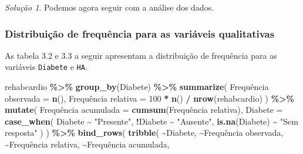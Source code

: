 \documentclass[
]{latex/krantz}
\newenvironment{Shaded}{\begin{snugshade}}{\end{snugshade}}
\newcommand{\AttributeTok}[1]{\textcolor[rgb]{0.13,0.29,0.53}{#1}}
\newcommand{\DecValTok}[1]{\textcolor[rgb]{0.00,0.00,0.81}{#1}}
\newcommand{\FunctionTok}[1]{\textcolor[rgb]{0.13,0.29,0.53}{\textbf{#1}}}
\newcommand{\NormalTok}[1]{#1}
\newcommand{\OtherTok}[1]{\textcolor[rgb]{0.56,0.35,0.01}{#1}}
\newcommand{\SpecialCharTok}[1]{\textcolor[rgb]{0.81,0.36,0.00}{\textbf{#1}}}
\newcommand{\StringTok}[1]{\textcolor[rgb]{0.31,0.60,0.02}{#1}}
\theoremstyle{definition}
\theoremstyle{definition}
\theoremstyle{definition}
\theoremstyle{definition}
\theoremstyle{remark}
\newtheorem*{solution}{Solução}
\begin{document}
\begin{solution}
Podemos agora seguir com a análise dos dados.

\hypertarget{distribuiuxe7uxe3o-de-frequuxeancia-para-as-variuxe1veis-qualitativas}{%
\subsubsection*{Distribuição de frequência para as variáveis qualitativas}\label{distribuiuxe7uxe3o-de-frequuxeancia-para-as-variuxe1veis-qualitativas}}

As tabela 3.2 e 3.3 a seguir apresentam a distribuição de frequência para as variáveis \texttt{Diabete} e \texttt{HA}.

\begin{Shaded}
\begin{Highlighting}[]
\NormalTok{rehabcardio }\SpecialCharTok{\%\textgreater{}\%}
  \FunctionTok{group\_by}\NormalTok{(Diabete) }\SpecialCharTok{\%\textgreater{}\%}
  \FunctionTok{summarize}\NormalTok{(}
    \StringTok{\textasciigrave{}}\AttributeTok{Frequência observada}\StringTok{\textasciigrave{}} \OtherTok{=} \FunctionTok{n}\NormalTok{(),}
    \StringTok{\textasciigrave{}}\AttributeTok{Frequência relativa}\StringTok{\textasciigrave{}} \OtherTok{=} \DecValTok{100} \SpecialCharTok{*} \FunctionTok{n}\NormalTok{() }\SpecialCharTok{/} \FunctionTok{nrow}\NormalTok{(rehabcardio)}
\NormalTok{  ) }\SpecialCharTok{\%\textgreater{}\%}
  \FunctionTok{mutate}\NormalTok{(}
    \StringTok{\textasciigrave{}}\AttributeTok{Frequência acumulada}\StringTok{\textasciigrave{}} \OtherTok{=} \FunctionTok{cumsum}\NormalTok{(}\StringTok{\textasciigrave{}}\AttributeTok{Frequência relativa}\StringTok{\textasciigrave{}}\NormalTok{),}
    \AttributeTok{Diabete =} \FunctionTok{case\_when}\NormalTok{(}
\NormalTok{      Diabete }\SpecialCharTok{\textasciitilde{}} \StringTok{"Presente"}\NormalTok{,}
      \SpecialCharTok{!}\NormalTok{Diabete }\SpecialCharTok{\textasciitilde{}} \StringTok{"Ausente"}\NormalTok{,}
      \FunctionTok{is.na}\NormalTok{(Diabete) }\SpecialCharTok{\textasciitilde{}} \StringTok{"Sem resposta"}
\NormalTok{    )}
\NormalTok{  ) }\SpecialCharTok{\%\textgreater{}\%}
  \FunctionTok{bind\_rows}\NormalTok{(}
    \FunctionTok{tribble}\NormalTok{(}
      \SpecialCharTok{\textasciitilde{}}\NormalTok{Diabete, }\SpecialCharTok{\textasciitilde{}}\StringTok{\textasciigrave{}}\AttributeTok{Frequência observada}\StringTok{\textasciigrave{}}\NormalTok{, }\SpecialCharTok{\textasciitilde{}}\StringTok{\textasciigrave{}}\AttributeTok{Frequência relativa}\StringTok{\textasciigrave{}}\NormalTok{,  }\SpecialCharTok{\textasciitilde{}}\StringTok{\textasciigrave{}}\AttributeTok{Frequência acumulada}\StringTok{\textasciigrave{}}\NormalTok{,}

\end{Highlighting}
\end{Shaded}
\end{solution}
\end{document}
